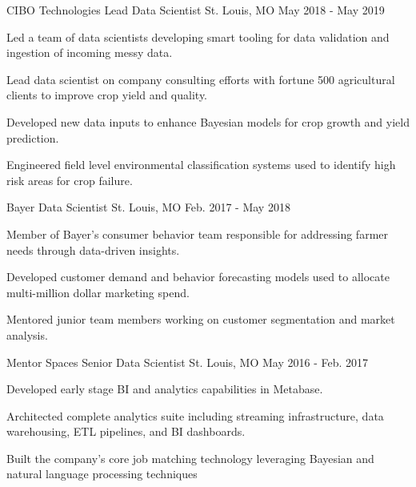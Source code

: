 \begin{cventries}
  \cventry
    {CIBO Technologies} %
    {Lead Data Scientist} %
    {St. Louis, MO} %
    {May 2018 - May 2019} %
    {
      \begin{cvitems} %
        \item {Led a team of data scientists developing smart tooling for data validation and ingestion of incoming messy data.}
        \item {Lead data scientist on company consulting efforts with fortune 500 agricultural clients to improve crop yield and quality.}
        \item {Developed new data inputs to enhance Bayesian models for crop growth and yield prediction.} 
        \item {Engineered field level environmental classification systems used to identify high risk areas for crop failure.}
      \end{cvitems}
    }
    \vspace{2em}

  \cventry
    {Bayer} %
    {Data Scientist} %
    {St. Louis, MO} %
    {Feb. 2017 - May 2018} %
    {
      \begin{cvitems} %
        \item {Member of Bayer's consumer behavior team responsible for addressing farmer needs through data-driven insights.}
        \item {Developed customer demand and behavior forecasting models used to allocate multi-million dollar marketing spend.}
        \item {Mentored junior team members working on customer segmentation and market analysis.}
      \end{cvitems}
    }
    \vspace{2em}

  \cventry
    {Mentor Spaces} %
    {Senior Data Scientist} %
    {St. Louis, MO} %
    {May 2016 - Feb. 2017} %
    {
      \begin{cvitems} %
        \item {Developed early stage BI and analytics capabilities in Metabase.}
        \item {Architected complete analytics suite including streaming infrastructure, data warehousing, ETL pipelines, and BI dashboards.}
        \item {Built the company's core job matching technology leveraging Bayesian and natural language processing techniques}
      \end{cvitems}
    }
    \vspace{2em}


\end{cventries}
